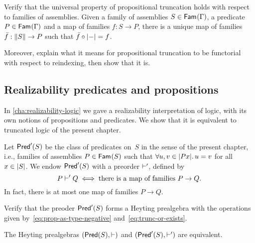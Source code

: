 \begin{exercise}
  Verify that the universal property of propositional truncation holds with respect to families of assemblies. Given a family of assemblies $S \in \Fam{\Gamma}$, a predicate $P \in \Fam{\Gamma}$ and a map of families $f : S \to P$, there is a unique map of families $\bar{f} : \Trunc{S} \to P$ such that $\bar{f} \circ \trunc{{-}} = f$.

  Moreover, explain what it means for propositional truncation to be functorial with respect to reindexing, then show that it is.
\end{exercise}


\subsection{Realizability predicates and propositions}
\label{sec:real-pred-prop}

In \cref{cha:realizability-logic} we gave a realizability interpretation of logic, with its own notions of propositions and predicates. We show that it is equivalent to truncated logic of the present chapter.

Let $\PredT{S}$ be the class of predicates on~$S$ in the sense of the present chapter, i.e., families of assemblies $P \in \Fam{S}$ such that $\all{u, v \in \S{P x}} u = v$ for all $x \in \S{S}$. We endow $\PredT{S}$ with a preorder $\entails'$, defined by
%
\begin{equation*}
  P \entails' Q \iff
  \text{there is a map of families $P \to Q$}.
\end{equation*}
%
In fact, there is at most one map of families $P \to Q$.

\begin{exercise}
  Verify that the preoder $\PredT{S}$ forms a Heyting prealgebra with the operations given by~\eqref{eq:prop-as-type-negative} and~\eqref{eq:trunc-or-exists}.
\end{exercise}


\begin{theorem}
  \label{thm:pred-equiv-pred}
  The Heyting prealgebras $(\Pred{S}, {\entails})$ and $(\PredT{S}, {\entails'})$ are equivalent.
\end{theorem}

